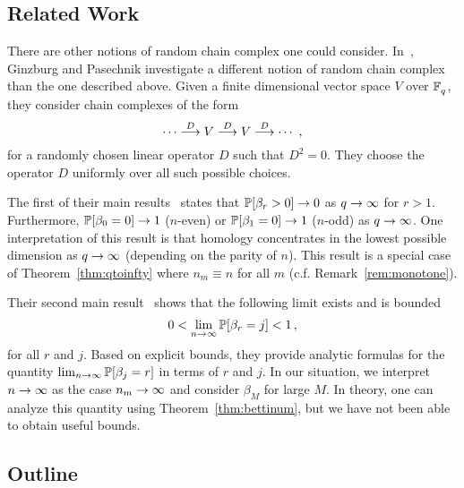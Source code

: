\subsection*{Related Work} There are other notions of random chain complex
one could consider. In~\cite{ginzburg2017random}, Ginzburg and Pasechnik investigate
a different notion of random chain complex than the one described above.
Given a finite dimensional vector space $V$ over $\mathbb{F}_q^{}$, they consider chain
complexes of the form
\[
  \cdots \stackrel{D}{\longrightarrow} V \stackrel{D}{\longrightarrow} V \stackrel{D}{\longrightarrow} \cdots \, \, ,
\]
for a randomly chosen linear operator $D$ such that $D^2 = 0$. They choose the 
operator $D$ uniformly over all such possible choices. 

The first of their main results~\cite[Thm 2.1]{ginzburg2017random} states that
$\mathbb{P}[\beta_r > 0] \rightarrow 0$ as $q \rightarrow \infty$ for $r>1$. Furthermore, $\mathbb{P}[\beta_0
= 0] \rightarrow 1$ ($n$-even) or $\mathbb{P}[\beta_1 = 0] \rightarrow 1$ ($n$-odd) as $q \rightarrow \infty$.
One interpretation of this result is that homology concentrates in the
lowest possible dimension as $q \rightarrow \infty$ (depending on the parity of $n$).
This result is a special case of Theorem~\ref{thm:qtoinfty} where $n_m \equiv
n$ for all $m$ (c.f.  Remark~\ref{rem:monotone}).

Their second main result~\cite[Thm 2.2]{ginzburg2017random} shows that 
the following limit exists and is bounded
\[
  0 < \lim_{n \rightarrow \infty} \mathbb{P}[\beta_r = j] < 1 \, ,
\]
for all $r$ and $j$. Based on explicit bounds, they provide analytic
formulas for the quantity $\lim_{n\rightarrow \infty}\mathbb{P}[\beta_j=r]$ in terms
of $r$ and $j$. In our situation, we interpret $n \rightarrow \infty$ as the case
$n_m \rightarrow \infty$ and consider $\beta_M$ for large $M$. In theory,
one can analyze this quantity using Theorem~\ref{thm:bettinum},
but we have not been able to obtain useful bounds.

\subsection*{Outline}
